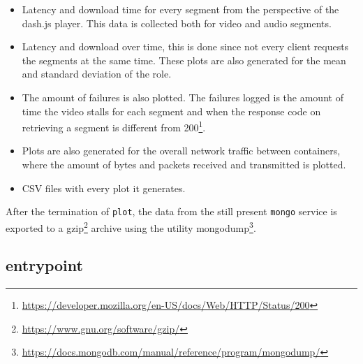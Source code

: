 \begin{itemize}
    \item Latency and download time for every segment from the perspective of the dash.js player. This data is collected both for video and audio segments.
    \item Latency and download over time, this is done since not every client requests the segments at the same time. These plots are also generated for the mean and standard deviation of the role.
    \item The amount of failures is also plotted. The failures logged is the amount of time the video stalls for each segment  and when the response code on retrieving a segment is different from 200\footnote{\url{https://developer.mozilla.org/en-US/docs/Web/HTTP/Status/200}}.
    \item Plots are also generated for the overall network traffic between containers, where the amount of bytes and packets received and transmitted is plotted.
    \item \acs{CSV} files with every plot it generates.
\end{itemize}

After the termination of \texttt{plot}, the data from the still present \texttt{mongo} service is exported to a gzip\footnote{\url{https://www.gnu.org/software/gzip/}} archive using the utility mongodump\footnote{\url{https://docs.mongodb.com/manual/reference/program/mongodump/}}. 




\subsection{entrypoint}
\label{sec:experiment_entrypoint}

